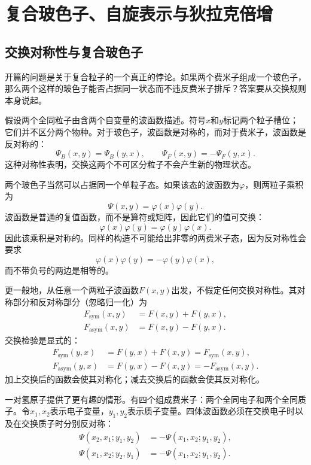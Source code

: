 \chapter{复合玻色子、自旋表示与狄拉克倍增}

\section{交换对称性与复合玻色子}

开篇的问题是关于复合粒子的一个真正的悖论。如果两个费米子组成一个玻色子，那么两个这样的玻色子能否占据同一状态而不违反费米子排斥？答案要从交换规则本身说起。

假设两个全同粒子由含两个自变量的波函数描述。符号\(x\)和\(y\)标记两个粒子槽位；它们并不区分两个物种。对于玻色子，波函数是对称的，而对于费米子，波函数是反对称的：
\begin{equation}
\Psi_B(x,y)=\Psi_B(y,x),
\qquad
\Psi_F(x,y)=-\Psi_F(y,x).
\end{equation}
这种对称性表明，交换这两个不可区分粒子不会产生新的物理状态。

两个玻色子当然可以占据同一个单粒子态。如果该态的波函数为\(\varphi\)，则两粒子乘积为
\begin{equation}
\Psi(x,y)=\varphi(x)\varphi(y).
\end{equation}
波函数是普通的复值函数，而不是算符或矩阵，因此它们的值可交换：
\begin{equation}
\varphi(x)\varphi(y)=\varphi(y)\varphi(x).
\end{equation}
因此该乘积是对称的。同样的构造不可能给出非零的两费米子态，因为反对称性会要求
\begin{equation}
\varphi(x)\varphi(y)=-\varphi(y)\varphi(x),
\end{equation}
而不带负号的两边是相等的。

更一般地，从任意一个两粒子波函数\(F(x,y)\)出发，不假定任何交换对称性。其对称部分和反对称部分（忽略归一化）为
\begin{align}
F_{\mathrm{sym}}(x,y)&=F(x,y)+F(y,x),\\
F_{\mathrm{asym}}(x,y)&=F(x,y)-F(y,x).
\end{align}
交换检验是显式的：
\begin{align}
F_{\mathrm{sym}}(y,x)
&=F(y,x)+F(x,y)
=F_{\mathrm{sym}}(x,y),\\
F_{\mathrm{asym}}(y,x)
&=F(y,x)-F(x,y)
=-F_{\mathrm{asym}}(x,y).
\end{align}
加上交换后的函数会使其对称化；减去交换后的函数会使其反对称化。

一对氢原子提供了更有趣的情形。有四个组成费米子：两个全同电子和两个全同质子。令\(x_1,x_2\)表示电子变量，\(y_1,y_2\)表示质子变量。四体波函数必须在交换电子时以及在交换质子时分别反对称：
\begin{align}
\Psi(x_2,x_1;y_1,y_2)
&=-\Psi(x_1,x_2;y_1,y_2),\\
\Psi(x_1,x_2;y_2,y_1)
&=-\Psi(x_1,x_2;y_1,y_2).
\end{align}

